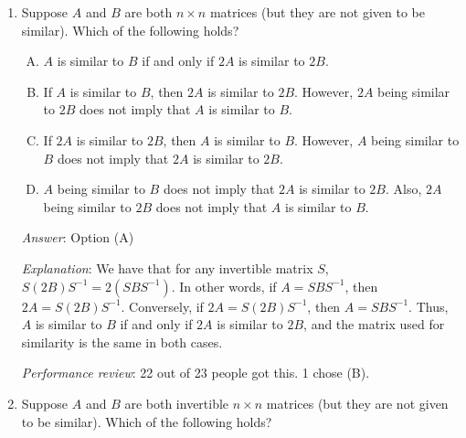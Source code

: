 \documentclass[10pt]{amsart}
\begin{document}
\begin{enumerate}
  {\em Answer}: Option (A)

  {\em Explanation}: We have that for any invertible matrix $S$,
  $S(-B)S^{-1} = -(SBS^{-1})$. In other words, if $A = SBS^{-1}$, then
  $-A = S(-B)S^{-1}$. Conversely, if $-A = S(-B)S^{-1}$, then $A =
  SBS^{-1}$. Thus, $A$ is similar to $B$ if and only if $-A$ is
  similar to $-B$, and the matrix used for similarity is the same in
  both cases.

  Note that invertibility of $A$ or $B$ is not necessary for this
  question, and the inclusion of the adjective ``invertible'' in the
  original print version of the quiz was based on an erroneous
  copy-paste. However, the question is correct even with the
  ``invertible'' assumption.

  {\em Performance review}: 19 out of 23 people got this. 2 chose (D),
  1 chose (B), 1 left the question blank.
\item Suppose $A$ and $B$ are both $n \times n$ matrices (but they are
  not given to be similar). Which of the following holds?

  \begin{enumerate}[(A)]
  \item $A$ is similar to $B$ if and only if $2A$ is similar to $2B$.
  \item If $A$ is similar to $B$, then $2A$ is similar to
    $2B$. However, $2A$ being similar to $2B$ does not imply that
    $A$ is similar to $B$.
  \item If $2A$ is similar to $2B$, then $A$ is similar to
    $B$. However, $A$ being similar to $B$ does not imply that $2A$
    is similar to $2B$.
  \item $A$ being similar to $B$ does not imply that $2A$ is similar
    to $2B$. Also, $2A$ being similar to $2B$ does not imply that
    $A$ is similar to $B$.
  \end{enumerate}

  {\em Answer}: Option (A)

  {\em Explanation}: We have that for any invertible matrix $S$,
  $S(2B)S^{-1} = 2(SBS^{-1})$. In other words, if $A = SBS^{-1}$, then
  $2A = S(2B)S^{-1}$. Conversely, if $2A = S(2B)S^{-1}$, then $A =
  SBS^{-1}$. Thus, $A$ is similar to $B$ if and only if $2A$ is
  similar to $2B$, and the matrix used for similarity is the same in
  both cases.

  {\em Performance review}: 22 out of 23 people got this. 1 chose (B).

\item Suppose $A$ and $B$ are both invertible $n \times n$ matrices
  (but they are not given to be similar). Which of the following
  holds?


\end{enumerate}
\end{document}
